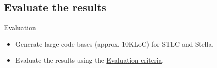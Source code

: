 \documentclass[serif, aspectratio=169]{beamer}
\begin{document}
\subsection{Evaluate the results}

\begin{frame}{Evaluation}
    \begin{itemize}
        \item Generate large code bases (approx. 10KLoC) for STLC and Stella.
        \item Evaluate the results using the \hyperlink{sec:evaluation_criteria}{Evaluation criteria}.
    \end{itemize}

\end{frame}







\end{document}
